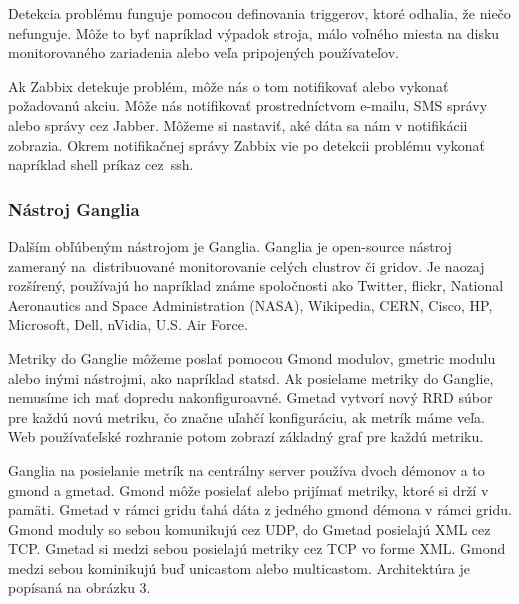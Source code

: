 \documentclass[a4paper, usesections, upjsfrontpage, disablespecwarning, thesismargins, thesislinespacing]{rnthesissvk}
\begin{document}
Detekcia problému funguje pomocou definovania triggerov, ktoré odhalia, že niečo nefunguje.
Môže to byť napríklad výpadok stroja, málo voľného miesta na disku monitorovaného zariadenia alebo veľa pripojených používateľov.

Ak Zabbix detekuje problém, môže nás o tom notifikovať alebo vykonať požadovanú akciu.
Môže nás notifikovať prostredníctvom e-mailu, SMS správy alebo správy cez Jabber.
Môžeme si nastaviť, aké dáta sa nám v notifikácii zobrazia.
Okrem notifikačnej správy Zabbix vie po detekcii problému vykonať napríklad shell príkaz cez~ssh.

\subsubsection{Nástroj Ganglia}

\noindent
Dalším obľúbeným nástrojom je Ganglia.
Ganglia je open-source nástroj zameraný na~distribuované monitorovanie celých clustrov či gridov.
Je naozaj rozšírený, používajú ho napríklad známe spoločnosti ako Twitter, flickr, National Aeronautics and Space Administration (NASA), Wikipedia, CERN, Cisco, HP, Microsoft, Dell, nVidia, U.S. Air Force.

Metriky do Ganglie môžeme poslať pomocou Gmond modulov, gmetric modulu alebo inými nástrojmi, ako napríklad statsd.
Ak posielame metriky do Ganglie, nemusíme ich mať dopredu nakonfiguroavné.
Gmetad vytvorí nový RRD súbor pre každú novú metriku, čo značne uľahčí konfiguráciu, ak metrík máme veľa.
Web používaťeľské rozhranie potom zobrazí základný graf pre každú metriku.

Ganglia na posielanie metrík na centrálny server používa dvoch démonov a to gmond a gmetad.
Gmond môže posielať alebo prijímať metriky, ktoré si drží v pamäti.
Gmetad v rámci gridu ťahá dáta z jedného gmond démona v rámci gridu.
Gmond moduly so sebou komunikujú cez UDP, do Gmetad posielajú XML cez TCP.
Gmetad si medzi sebou posielajú metriky cez TCP vo forme XML.
Gmond medzi sebou kominikujú buď unicastom alebo multicastom.
Architektúra je popísaná na obrázku 3.
\end{document}
